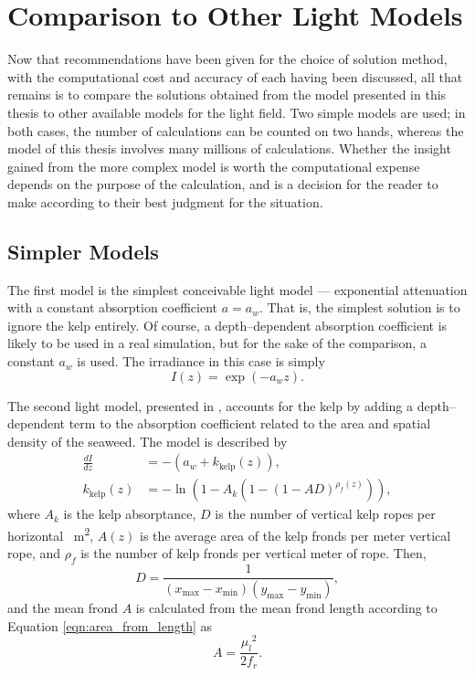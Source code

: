 \documentclass[ms,cpyr,lof,lot]{uathesis}
\newcommand\xmin{{x_{\min}}}
\newcommand\xmax{{x_{\max}}}
\newcommand\ymin{{y_{\min}}}
\newcommand\ymax{{y_{\max}}}
\begin{document}
\section{Comparison to Other Light Models}

Now that recommendations have been given for the choice of solution method, with the computational cost and accuracy of each having been discussed, all that remains is to compare the solutions obtained from the model presented in this thesis to other available models for the light field.
Two simple models are used; in both cases, the number of calculations can be counted on two hands, whereas the model of this thesis involves many millions of calculations.
Whether the insight gained from the more complex model is worth the computational expense depends on the purpose of the calculation, and is a decision for the reader to make according to their best judgment for the situation.

\subsection{Simpler Models}
The first model is the simplest conceivable light model --- exponential attenuation with a constant absorption coefficient $a=a_w$.
That is, the simplest solution is to ignore the kelp entirely.
Of course, a depth--dependent absorption coefficient is likely to be used in a real simulation, but for the sake of the comparison, a constant $a_w$ is used.
The irradiance in this case is simply
\begin{equation}
  I(z) = \exp\left(-a_w z \right).
\end{equation}

The second light model, presented in \citep{broch_modelling_2012}, accounts for the kelp by adding a depth--dependent term to the absorption coefficient related to the area and spatial density of the seaweed.
The model is described by
\begin{align}
  \frac{dI}{dz} &= -\left(a_w + k_{\mbox{kelp}}(z)\right),
  \label{eqn:exp_kelp_dIdz}\\
  k_{\mbox{kelp}}(z) &= -\ln(1-A_k(1-(1-AD)^{\rho_f(z)})),
  \label{eqn:exp_kelp_k}
\end{align}
where $A_k$ is the kelp absorptance, $D$ is the number of vertical kelp ropes per horizontal \SI{}{\m\squared}, $A(z)$ is the average area of the kelp fronds per meter vertical rope, and $\rho_f$ is the number of kelp fronds per vertical meter of rope.
Then,
\begin{equation}
  D = \frac{1}{\left(\xmax-\xmin\right) \left(\ymax-\ymin\right)},
\end{equation}
and the mean frond $A$ is calculated from the mean frond length according to Equation \eqref{eqn:area_from_length} as
\begin{equation}
  A = \frac{{\mu_l}^2}{2f_r}.
\end{equation}
\end{document}
